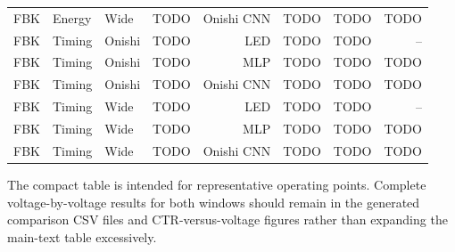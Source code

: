 \begin{table}[H]
{\begin{tabular}{llllrrrr}
        FBK & Energy & Wide   & TODO & Onishi CNN & TODO & TODO & TODO \\
        \addlinespace
        FBK & Timing & Onishi & TODO & LED        & TODO & TODO & -- \\
        FBK & Timing & Onishi & TODO & MLP        & TODO & TODO & TODO \\
        FBK & Timing & Onishi & TODO & Onishi CNN & TODO & TODO & TODO \\
        FBK & Timing & Wide   & TODO & LED        & TODO & TODO & -- \\
        FBK & Timing & Wide   & TODO & MLP        & TODO & TODO & TODO \\
        FBK & Timing & Wide   & TODO & Onishi CNN & TODO & TODO & TODO \\
        \bottomrule
    \end{tabular}%
    }
\end{table}

\noindent
The compact table is intended for representative operating points. Complete voltage-by-voltage results for both windows should remain in the generated comparison CSV files and CTR-versus-voltage figures rather than expanding the main-text table excessively.
